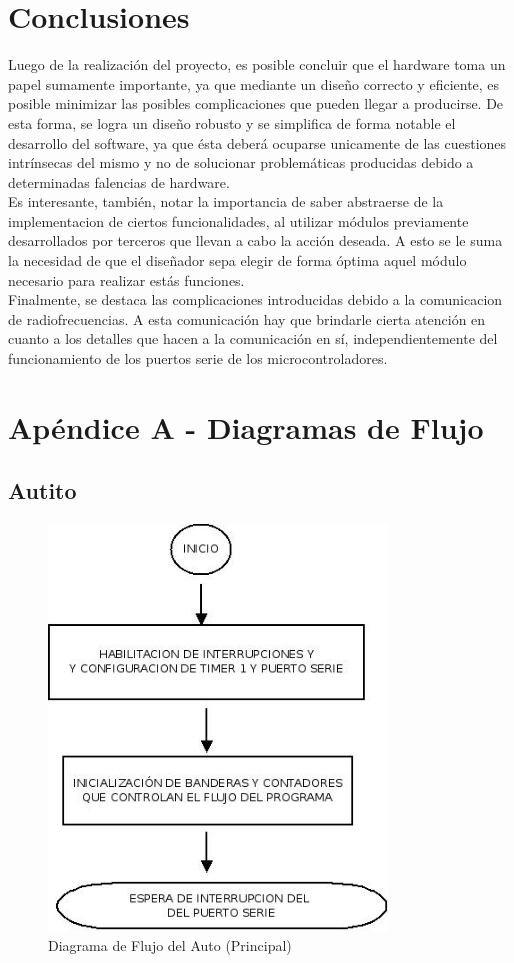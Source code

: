 \documentclass[a4paper,10pt]{article}
\begin{document}
	
   
	\section{Conclusiones}
		Luego de la realización del proyecto, es posible concluir que el hardware toma un papel sumamente importante, ya que mediante un diseño correcto y eficiente, es posible minimizar las posibles complicaciones que pueden llegar a producirse. De esta forma, se logra un diseño robusto y se simplifica de forma notable el desarrollo del software, ya que ésta deberá ocuparse unicamente de las cuestiones intrínsecas del mismo y no de solucionar problemáticas producidas debido a determinadas falencias de hardware.\\
		\indent Es interesante, también, notar la importancia de saber abstraerse de la implementacion de ciertos funcionalidades, al utilizar módulos previamente desarrollados por terceros que llevan a cabo la acción deseada. A esto se le suma la necesidad de que el diseñador sepa elegir de forma óptima aquel módulo necesario para realizar estás funciones.\\
		\indent Finalmente, se destaca las complicaciones introducidas debido a la comunicacion de radiofrecuencias. A esta comunicación hay que brindarle cierta atención en cuanto a los detalles que hacen a la comunicación en sí, independientemente  del funcionamiento de los puertos serie de los microcontroladores.
			
\newpage
\newpage
		\section{Apéndice A - Diagramas de Flujo}
			\subsection{Autito}

				\begin{figure}[!htb]
					\centering
					\includegraphics[width=9cm]{Imagenes/DiagFlujoAuto2.jpg}
					\caption{Diagrama de Flujo del Auto (Principal)} \label{AutoFlujo1}
				\end{figure}
\end{document}
